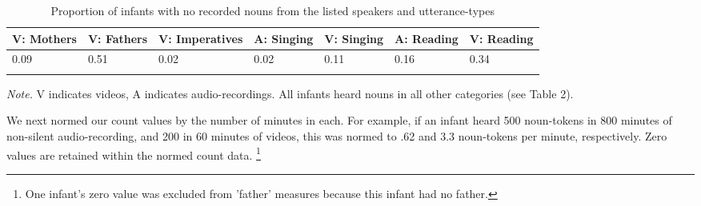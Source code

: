 \documentclass[floatsintext,man]{apa6}
\theoremstyle{definition}
\theoremstyle{definition}
\theoremstyle{definition}
\theoremstyle{remark}
\begin{document}
\begin{table}[tbp]
\begin{center}
\begin{threeparttable}
\caption{\label{tab:propna-missing-tables}Proportion of infants with no recorded nouns from the listed speakers and utterance-types}
\small{
\begin{tabular}{lllllll}
\toprule
V: Mothers & \multicolumn{1}{c}{V: Fathers} & \multicolumn{1}{c}{V: Imperatives} & \multicolumn{1}{c}{A: Singing} & \multicolumn{1}{c}{V: Singing} & \multicolumn{1}{c}{A: Reading} & \multicolumn{1}{c}{V: Reading}\\
\midrule
0.09 & 0.51 & 0.02 & 0.02 & 0.11 & 0.16 & 0.34\\
\bottomrule
\addlinespace
\end{tabular}
}
\begin{tablenotes}[para]
\textit{Note.} V indicates videos, A indicates audio-recordings. All infants heard nouns in all other categories (see Table 2).
\end{tablenotes}
\end{threeparttable}
\end{center}
\end{table}

We next normed our count values by the number of minutes in each. For
example, if an infant heard 500 noun-tokens in 800 minutes of non-silent
audio-recording, and 200 in 60 minutes of videos, this was normed to .62
and 3.3 noun-tokens per minute, respectively. Zero values are retained
within the normed count data.
\footnote{One infant's zero value was excluded from 'father' measures because this infant had no father.}
\end{document}
